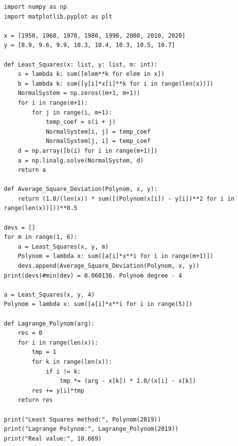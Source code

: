 \begin{lstlisting}
import numpy as np
import matplotlib.pyplot as plt

x = [1950, 1960, 1970, 1980, 1990, 2000, 2010, 2020]
y = [8.9, 9.6, 9.9, 10.3, 10.4, 10.3, 10.5, 10.7]

def Least_Squares(x: list, y: list, m: int):
    s = lambda k: sum([elem**k for elem in x])
    b = lambda k: sum([y[i]*x[i]**k for i in range(len(x))])
    NormalSystem = np.zeros((m+1, m+1))
    for i in range(m+1):
        for j in range(i, m+1):
            temp_coef = s(i + j)
            NormalSystem[i, j] = temp_coef
            NormalSystem[j, i] = temp_coef
    d = np.array([b(i) for i in range(m+1)])
    a = np.linalg.solve(NormalSystem, d)
    return a

def Average_Square_Deviation(Polynom, x, y):
    return (1.0/(len(x)) * sum([(Polynom(x[i]) - y[i])**2 for i in range(len(x))]))**0.5

devs = []
for m in range(1, 6):
    a = Least_Squares(x, y, m)
    Polynom = lambda x: sum([a[i]*x**i for i in range(m+1)])
    devs.append(Average_Square_Deviation(Polynom, x, y))
print(devs)#min(dev) = 0.060136. Polynom degree - 4

a = Least_Squares(x, y, 4)
Polynom = lambda x: sum([a[i]*x**i for i in range(5)])

def Lagrange_Polynom(arg):
    res = 0
    for i in range(len(x)):
        tmp = 1
        for k in range(len(x)):
            if i != k:
                tmp *= (arg - x[k]) * 1.0/(x[i] - x[k])
        res += y[i]*tmp
    return res

print("Least Squares method:", Polynom(2019))
print("Lagrange Polynom:", Lagrange_Polynom(2019))
print("Real value:", 10.669)
\end{lstlisting}